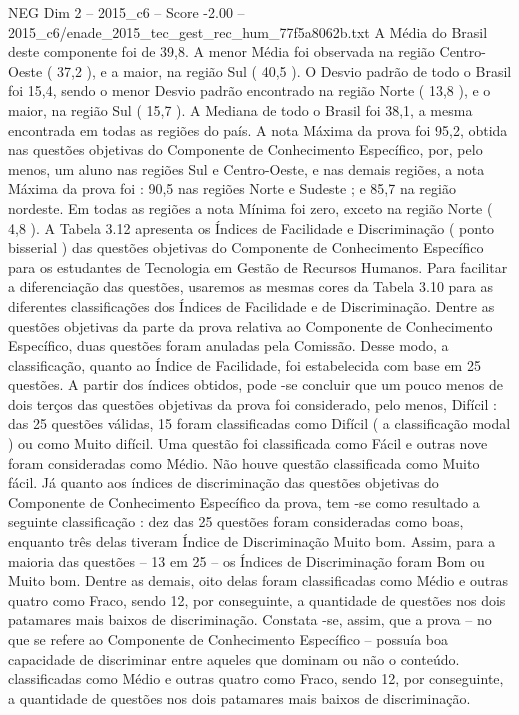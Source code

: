 \begin{textsample}{NEG Dim 2 – 2015\_c6 – Score -2.00 – 2015\_c6/enade\_2015\_tec\_gest\_rec\_hum\_77f5a8062b.txt}
A Média do Brasil deste componente foi de 39,8.
A menor Média foi observada na região Centro-Oeste ( 37,2 ), e a maior, na região Sul ( 40,5 ).
O Desvio padrão de todo o Brasil foi 15,4, sendo o menor Desvio padrão encontrado na região Norte ( 13,8 ), e o maior, na região Sul ( 15,7 ).
A Mediana de todo o Brasil foi 38,1, a mesma encontrada em todas as regiões do país.
A nota Máxima da prova foi 95,2, obtida nas questões objetivas do Componente de Conhecimento Específico, por, pelo menos, um aluno nas regiões Sul e Centro-Oeste, e nas demais regiões, a nota Máxima da prova foi : 90,5 nas regiões Norte e Sudeste ; e 85,7 na região nordeste.
Em todas as regiões a nota Mínima foi zero, exceto na região Norte ( 4,8 ).
A Tabela 3.12 apresenta os Índices de Facilidade e Discriminação ( ponto bisserial ) das questões objetivas do Componente de Conhecimento Específico para os estudantes de Tecnologia em Gestão de Recursos Humanos.
Para facilitar a diferenciação das questões, usaremos as mesmas cores da Tabela 3.10 para as diferentes classificações dos Índices de Facilidade e de Discriminação.
Dentre as questões objetivas da parte da prova relativa ao Componente de Conhecimento Específico, duas questões foram anuladas pela Comissão.
Desse modo, a classificação, quanto ao Índice de Facilidade, foi estabelecida com base em 25 questões.
A partir dos índices obtidos, pode -se concluir que um pouco menos de dois terços das questões objetivas da prova foi considerado, pelo menos, Difícil : das 25 questões válidas, 15 foram classificadas como Difícil ( a classificação modal ) ou como Muito difícil.
Uma questão foi classificada como Fácil e outras nove foram consideradas como Médio.
Não houve questão classificada como Muito fácil.
Já quanto aos índices de discriminação das questões objetivas do Componente de Conhecimento Específico da prova, tem -se como resultado a seguinte classificação : dez das 25 questões foram consideradas como boas, enquanto três delas tiveram Índice de Discriminação Muito bom.
Assim, para a maioria das questões – 13 em 25 – os Índices de Discriminação foram Bom ou Muito bom.
Dentre as demais, oito delas foram classificadas como Médio e outras quatro como Fraco, sendo 12, por conseguinte, a quantidade de questões nos dois patamares mais baixos de discriminação.
Constata -se, assim, que a prova – no que se refere ao Componente de Conhecimento Específico – possuía boa capacidade de discriminar entre aqueles que dominam ou não o conteúdo. classificadas como Médio e outras quatro como Fraco, sendo 12, por conseguinte, a quantidade de questões nos dois patamares mais baixos de discriminação.

\end{textsample}
